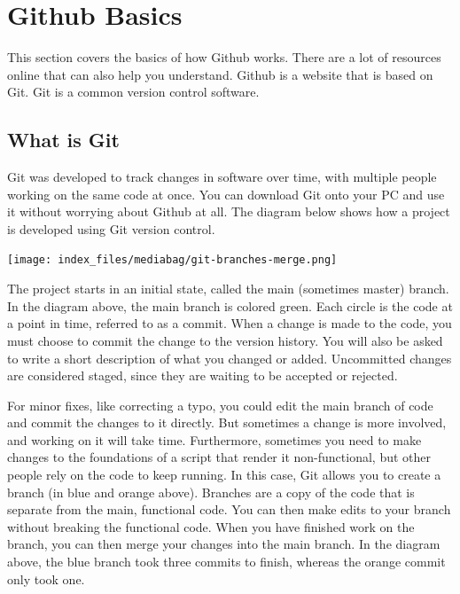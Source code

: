 \documentclass[
  letterpaper,
  DIV=11,
  numbers=noendperiod]{scrreprt}
\begin{document}

\hypertarget{github-basics}{%
\chapter{Github Basics}\label{github-basics}}

This section covers the basics of how Github works. There are a lot of
resources online that can also help you understand. Github is a website
that is based on Git. Git is a common version control software.

\hypertarget{what-is-git}{%
\section{What is Git}\label{what-is-git}}

Git was developed to track changes in software over time, with multiple
people working on the same code at once. You can download Git onto your
PC and use it without worrying about Github at all. The diagram below
shows how a project is developed using Git version control.

\texttt{[image: index\_files/mediabag/git-branches-merge.png]}

The project starts in an initial state, called the main (sometimes
master) branch. In the diagram above, the main branch is colored green.
Each circle is the code at a point in time, referred to as a commit.
When a change is made to the code, you must choose to commit the change
to the version history. You will also be asked to write a short
description of what you changed or added. Uncommitted changes are
considered staged, since they are waiting to be accepted or rejected.

For minor fixes, like correcting a typo, you could edit the main branch
of code and commit the changes to it directly. But sometimes a change is
more involved, and working on it will take time. Furthermore, sometimes
you need to make changes to the foundations of a script that render it
non-functional, but other people rely on the code to keep running. In
this case, Git allows you to create a branch (in blue and orange above).
Branches are a copy of the code that is separate from the main,
functional code. You can then make edits to your branch without breaking
the functional code. When you have finished work on the branch, you can
then merge your changes into the main branch. In the diagram above, the
blue branch took three commits to finish, whereas the orange commit only
took one.
\end{document}
